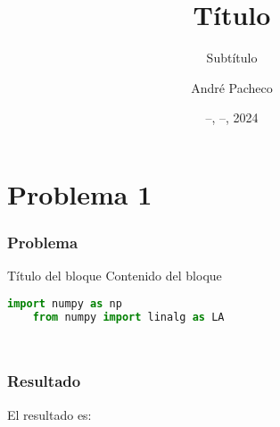 \documentclass{beamer}
\title{Título}
\subtitle{Subtítulo}
\author{André Pacheco}
\date{ --, --, 2024}
\begin{document}
    \maketitle
    
    
    \section{Problema 1}
    
    \begin{frame}[fragile]
    
    \frametitle{Problema}
    
    \begin{block}{Título del bloque}
        Contenido del bloque
    \end{block}
    
    \begin{lstlisting}[language=Python, backgroundcolor=\color{codegray}]
    import numpy as np
    from numpy import linalg as LA
    
    
    \end{lstlisting}
    \end{frame}
    
    
    \begin{frame}[fragile]
    \frametitle{Resultado}
    
    El resultado es:
    \begin{verbatim}
    
    
    \end{verbatim}
    
    \end{frame}
    
    
    
    
    
    \backmatter
    
\end{document}

